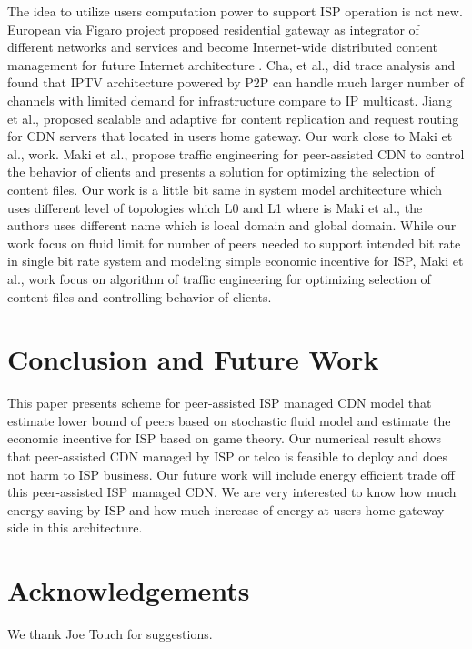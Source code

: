 \documentclass[paper]{ieice}
\begin{document}
The idea to utilize users computation power to support ISP operation is not new.  
European via Figaro project \cite{figaro} proposed residential gateway as integrator of different networks and services and become Internet-wide distributed content management for future Internet architecture \cite{figaro}. 
Cha, et al.,\cite{Cha:2008:NTP:1855641.1855646} did trace analysis and found that IPTV architecture powered by P2P can handle much larger number of channels with limited demand for infrastructure compare to IP multicast. 
Jiang et al., \cite{Jiang:2012:OMD:2413176.2413193} proposed scalable and adaptive for content replication and request routing for CDN servers that located in users home gateway. 
Our work close to Maki et al.,\cite{NaoyaMAKI2012} work.  
Maki et al.,\cite{NaoyaMAKI2012} propose traffic engineering for peer-assisted CDN to control the behavior of clients and presents a solution for optimizing the selection of content files.
Our work is a little bit same in system model architecture which uses different level of topologies which L0 and L1 where is Maki et al., \cite{NaoyaMAKI2012} the authors uses different name which is local domain and global domain. 
While our work focus on fluid limit for number of peers needed to support intended bit rate in single bit rate system and modeling simple economic incentive for ISP, Maki et al., \cite{NaoyaMAKI2012} work focus on algorithm of traffic engineering for optimizing selection of content files and controlling behavior of clients.

\section{Conclusion and Future Work}\label{conclude}
This paper presents scheme for peer-assisted ISP managed CDN model that estimate lower bound of peers based on stochastic fluid model and estimate the economic incentive for ISP based on game theory.  
Our numerical result shows that peer-assisted CDN managed by ISP or telco is feasible to deploy and does not harm to ISP business. 
Our future work will include energy efficient trade off this peer-assisted ISP managed CDN. 
We are very interested to know how much energy saving by ISP and how much increase of energy at users home gateway side in this architecture. 





\section*{Acknowledgements}
We thank Joe Touch for suggestions.
\end{document}
